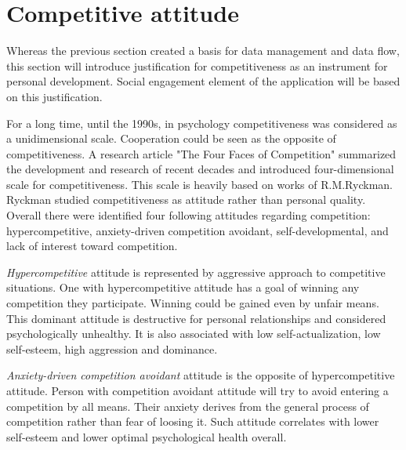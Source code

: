
\section{Competitive attitude}\label{sec:competitive-attitude}



Whereas the previous section created a basis for data management and data flow,
this section will introduce justification for competitiveness as an instrument for personal development.
Social engagement element of the application will be based on this justification.

For a long time, until the 1990s, in psychology competitiveness was considered as a unidimensional scale.
Cooperation could be seen as the opposite of competitiveness.
A research article "The Four Faces of Competition" summarized the development and research of recent decades
and introduced four-dimensional scale for competitiveness.\cite{the-four-faces-of-competetition}
This scale is heavily based on works of R.M.Ryckman.\cite{cit-ryckman-hca}\cite{cit-ryckman-adca}\cite{cit-ryckman-pdca}
Ryckman studied competitiveness as attitude rather than personal quality.
Overall there were identified four following attitudes regarding competition:
hypercompetitive, anxiety-driven competition avoidant, self-developmental, and lack of interest toward competition.

\textit{Hypercompetitive} attitude is represented by aggressive approach to competitive situations.
One with hypercompetitive attitude has a goal of winning any competition they participate.
Winning could be gained even by unfair means.
This dominant attitude is destructive for personal relationships and considered psychologically unhealthy.
It is also associated with low self-actualization, low self-esteem, high aggression and dominance.\cite{cit-ryckman-hca}

\textit{Anxiety-driven competition avoidant} attitude is the opposite of hypercompetitive attitude.
Person with competition avoidant attitude will try to avoid entering a competition by all means.
Their anxiety derives from the general process of competition rather than fear of loosing it.
Such attitude correlates with lower self-esteem and lower optimal psychological health overall.\cite{cit-ryckman-adca}

